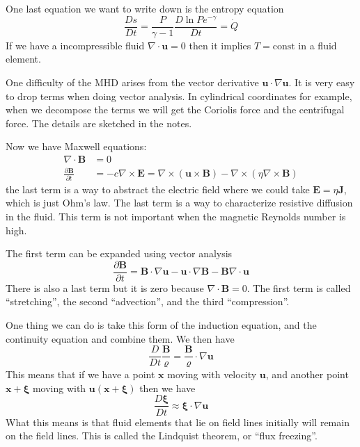 \documentclass[letterpaper, 11pt]{article}
\numberwithin{equation}{section}
\numberwithin{figure}{section}
\begin{document}
One last equation we want to write down is the entropy equation
\begin{equation}
  \label{eq:6}
  \frac{Ds}{Dt} = \frac{P}{\gamma - 1}\frac{D \ln P e^{-\gamma}}{D t} = \dot{Q}
\end{equation}
If we have a incompressible fluid $\nabla\cdot \mathbf{u} = 0$ then it implies
$T = \text{const}$ in a fluid element.

One difficulty of the MHD arises from the vector derivative $\mathbf{u}\cdot
\nabla \mathbf{u}$. It is very easy to drop terms when doing vector analysis. In
cylindrical coordinates for example, when we decompose the terms we will get the
Coriolis force and the centrifugal force. The details are sketched in the notes.

Now we have Maxwell equations:
\begin{align}
  \nabla\cdot \mathbf{B} & = 0 \\
  \frac{\partial \mathbf{B}}{\partial t} &= -c\nabla\times \mathbf{E} = \nabla \times (\mathbf{u}\times \mathbf{B}) - \nabla\times(\eta \nabla\times \mathbf{B})
\end{align}
the last term is a way to abstract the electric field where we could take
$\mathbf{E} = \eta \mathbf{J}$, which is just Ohm's law. The last term is a way
to characterize resistive diffusion in the fluid. This term is not important
when the magnetic Reynolds number is high.

The first term can be expanded using vector analysis
\begin{equation}
  \label{eq:7}
  \frac{\partial \mathbf{B}}{\partial t} = \mathbf{B}\cdot \nabla \mathbf{u} - \mathbf{u}\cdot \nabla \mathbf{B} - \mathbf{B}\nabla\cdot \mathbf{u}
\end{equation}
There is also a last term but it is zero because $\nabla\cdot \mathbf{B} = 0$.
The first term is called ``stretching'', the second ``advection'', and the third
``compression''.

One thing we can do is take this form of the induction equation, and the
continuity equation and combine them. We then have
\begin{equation}
  \label{eq:8}
  \frac{D}{Dt}\frac{\mathbf{B}}{\varrho} = \frac{\mathbf{B}}{\varrho}\cdot \nabla \mathbf{u}
\end{equation}
This means that if we have a point $\mathbf{x}$ moving with velocity
$\mathbf{u}$, and another point $\mathbf{x} + \boldsymbol{\xi}$ moving with
$\mathbf{u}(\mathbf{x} + \boldsymbol{\xi})$ then we have
\begin{equation}
  \label{eq:9}
  \frac{D\boldsymbol{\xi}}{D t} \approx \boldsymbol{\xi}\cdot \nabla \mathbf{u}
\end{equation}
What this means is that fluid elements that lie on field lines initially will
remain on the field lines. This is called the Lindquist theorem, or ``flux freezing''.
\end{document}
